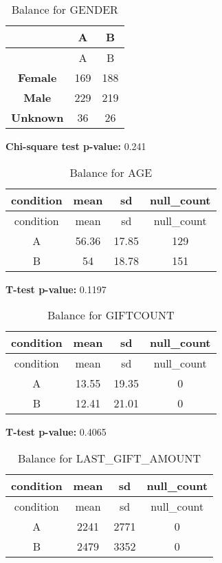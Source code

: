 \documentclass[
]{article}
\begin{document}
\begin{longtable}[]{@{}ccc@{}}
\caption{Balance for GENDER}\tabularnewline
\toprule\noalign{}
~ & A & B \\
\midrule\noalign{}
\endfirsthead
\toprule\noalign{}
~ & A & B \\
\midrule\noalign{}
\endhead
\bottomrule\noalign{}
\endlastfoot
\textbf{Female} & 169 & 188 \\
\textbf{Male} & 229 & 219 \\
\textbf{Unknown} & 36 & 26 \\
\end{longtable}

\textbf{Chi-square test p-value:} 0.241\\
\pagebreak

\begin{longtable}[]{@{}cccc@{}}
\caption{Balance for AGE}\tabularnewline
\toprule\noalign{}
condition & mean & sd & null\_count \\
\midrule\noalign{}
\endfirsthead
\toprule\noalign{}
condition & mean & sd & null\_count \\
\midrule\noalign{}
\endhead
\bottomrule\noalign{}
\endlastfoot
A & 56.36 & 17.85 & 129 \\
B & 54 & 18.78 & 151 \\
\end{longtable}

\textbf{T-test p-value:} 0.1197\\
\pagebreak

\begin{longtable}[]{@{}cccc@{}}
\caption{Balance for GIFTCOUNT}\tabularnewline
\toprule\noalign{}
condition & mean & sd & null\_count \\
\midrule\noalign{}
\endfirsthead
\toprule\noalign{}
condition & mean & sd & null\_count \\
\midrule\noalign{}
\endhead
\bottomrule\noalign{}
\endlastfoot
A & 13.55 & 19.35 & 0 \\
B & 12.41 & 21.01 & 0 \\
\end{longtable}

\textbf{T-test p-value:} 0.4065\\
\pagebreak

\begin{longtable}[]{@{}cccc@{}}
\caption{Balance for LAST\_GIFT\_AMOUNT}\tabularnewline
\toprule\noalign{}
condition & mean & sd & null\_count \\
\midrule\noalign{}
\endfirsthead
\toprule\noalign{}
condition & mean & sd & null\_count \\
\midrule\noalign{}
\endhead
\bottomrule\noalign{}
\endlastfoot
A & 2241 & 2771 & 0 \\
B & 2479 & 3352 & 0 \\
\end{longtable}
\end{document}
